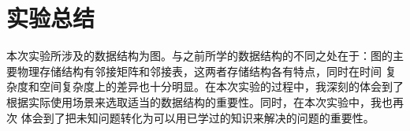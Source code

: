 \documentclass[a4paper,11pt]{article}%
\begin{document}
\section{实验总结}
本次实验所涉及的数据结构为图。与之前所学的数据结构的不同之处在于：图的主要物理存储结构有邻接矩阵和邻接表，这两者存储结构各有特点，同时在时间
复杂度和空间复杂度上的差异也十分明显。在本次实验的过程中，我深刻的体会到了根据实际使用场景来选取适当的数据结构的重要性。同时，在本次实验中，我也再次
体会到了把未知问题转化为可以用已学过的知识来解决的问题的重要性。
\end{document}
